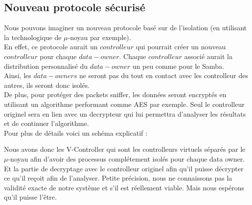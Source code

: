 \documentclass[a4paper, 12pt]{article}
\begin{document}
\subsection{Nouveau protocole sécurisé}
Nous pouvons imaginer un nouveau protocole basé sur de l'isolation (en utilisant la technologique de $\mu$-noyau par exemple).
\\En effet, ce protocole aurait un $controlleur$ qui pourrait créer un nouveau $controlleur$ pour chaque $data-owner$. Chaque $controlleur$ associé aurait la distribution personnalisé du $data-owner$ un peu comme pour le Samba.
\\ Ainsi, les $data-owners$ ne seront pas du tout en contact avec les controlleur des autres, ils seront donc isolés. 
\\De plus, pour protéger des packets sniffer, les données seront encryptés en utilisant un algorithme performant comme AES par exemple. Seul le controlleur originel sera en lien avec un decrypteur qui lui permettra d'analyser les résultats et de continuer l'algorithme.
\\Pour plus de détails voici un schéma explicatif :\\
\begin{center}
\end{center}
Nous avons donc les V-Controller qui sont les controlleurs virtuels séparés par le $\mu$-noyau afin d'avoir des processus complétement isolés pour chaque data owner. 
Et la partie de decryptage avec le controlleur originel afin qu'il puisse décrypter ce qu'il reçoit afin de l'analyser.
Petite précision, nous ne connaissons pas la validité exacte de notre système et s'il est réellement viable. Mais nous espérons qu'il puisse l'être.
\end{document}
